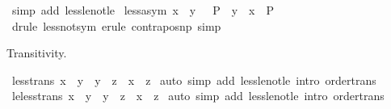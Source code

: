 \begin{isabellebody}
%
\isadelimproof
%
\endisadelimproof
%
\isatagproof
{}\isamarkupfalse%
\ {\isacharparenleft}{\kern0pt}simp\ add{\isacharcolon}{\kern0pt}\ less{\isacharunderscore}{\kern0pt}le{\isacharunderscore}{\kern0pt}not{\isacharunderscore}{\kern0pt}le{\isacharparenright}{\kern0pt}%
\endisatagproof
{\isafoldproof}%
%
\isadelimproof
\isanewline
%
\endisadelimproof
\isanewline
{}\isamarkupfalse%
\ less{\isacharunderscore}{\kern0pt}asym{\isacharcolon}{\kern0pt}\ {\isachardoublequoteopen}x\ {\isacharless}{\kern0pt}\ y\ {\isasymLongrightarrow}\ {\isacharparenleft}{\kern0pt}{\isasymnot}\ P\ {\isasymLongrightarrow}\ y\ {\isacharless}{\kern0pt}\ x{\isacharparenright}{\kern0pt}\ {\isasymLongrightarrow}\ P{\isachardoublequoteclose}\isanewline
%
\isadelimproof
%
\endisadelimproof
%
\isatagproof
{}\isamarkupfalse%
\ {\isacharparenleft}{\kern0pt}drule\ less{\isacharunderscore}{\kern0pt}not{\isacharunderscore}{\kern0pt}sym{\isacharcomma}{\kern0pt}\ erule\ contrapos{\isacharunderscore}{\kern0pt}np{\isacharparenright}{\kern0pt}\ simp%
\endisatagproof
{\isafoldproof}%
%
\isadelimproof
%
\endisadelimproof
%
\begin{isamarkuptext}%
Transitivity.%
\end{isamarkuptext}\isamarkuptrue%
\isamarkupfalse%
\ less{\isacharunderscore}{\kern0pt}trans{\isacharcolon}{\kern0pt}\ {\isachardoublequoteopen}x\ {\isacharless}{\kern0pt}\ y\ {\isasymLongrightarrow}\ y\ {\isacharless}{\kern0pt}\ z\ {\isasymLongrightarrow}\ x\ {\isacharless}{\kern0pt}\ z{\isachardoublequoteclose}\isanewline
%
\isadelimproof
%
\endisadelimproof
%
\isatagproof
{}\isamarkupfalse%
\ {\isacharparenleft}{\kern0pt}auto\ simp\ add{\isacharcolon}{\kern0pt}\ less{\isacharunderscore}{\kern0pt}le{\isacharunderscore}{\kern0pt}not{\isacharunderscore}{\kern0pt}le\ intro{\isacharcolon}{\kern0pt}\ order{\isacharunderscore}{\kern0pt}trans{\isacharparenright}{\kern0pt}%
\endisatagproof
{\isafoldproof}%
%
\isadelimproof
\isanewline
%
\endisadelimproof
\isanewline
{}\isamarkupfalse%
\ le{\isacharunderscore}{\kern0pt}less{\isacharunderscore}{\kern0pt}trans{\isacharcolon}{\kern0pt}\ {\isachardoublequoteopen}x\ {\isasymle}\ y\ {\isasymLongrightarrow}\ y\ {\isacharless}{\kern0pt}\ z\ {\isasymLongrightarrow}\ x\ {\isacharless}{\kern0pt}\ z{\isachardoublequoteclose}\isanewline
%
\isadelimproof
%
\endisadelimproof
%
\isatagproof
{}\isamarkupfalse%
\ {\isacharparenleft}{\kern0pt}auto\ simp\ add{\isacharcolon}{\kern0pt}\ less{\isacharunderscore}{\kern0pt}le{\isacharunderscore}{\kern0pt}not{\isacharunderscore}{\kern0pt}le\ intro{\isacharcolon}{\kern0pt}\ order{\isacharunderscore}{\kern0pt}trans{\isacharparenright}{\kern0pt}%

\end{isabellebody}
